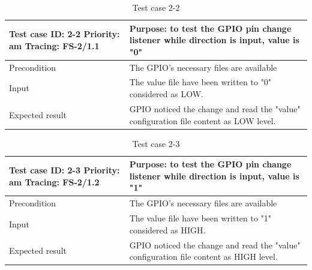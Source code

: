 \begin{table}[H]
	\caption{Test case 2-2}
	\label{table:TCase-FS2-2}
	\begin{center}
		\renewcommand{\arraystretch}{1.8}
		\begin{tabu} 
			to 0.9 \textwidth
			{  X[0.4, c] X[c] }
			\toprule
			Test case ID: 2-2 \newline Priority: am \newline Tracing: FS-2/1.1 & Purpose: to test the GPIO pin change listener while direction is input, value is "0"  \\ \midrule
			Precondition                                                       & The GPIO's necessary files are available                                              \\
			Input                                                              & The value file have been written to "0" considered as LOW.                            \\
			Expected result                                                    & GPIO noticed the change and read the "value" configuration file content as LOW level. \\ \bottomrule
		\end{tabu}
	\end{center}
\end{table} 

\begin{table}[H]
	\caption{Test case 2-3}
	\label{table:TCase-FS2-3}
	\begin{center}
		\renewcommand{\arraystretch}{1.8}
		\begin{tabu} 
			to 0.9 \textwidth
			{  X[0.4, c] X[c] }
			\toprule
			Test case ID: 2-3 \newline Priority: am \newline Tracing: FS-2/1.2 & Purpose: to test the GPIO pin change listener while direction is input, value is "1"   \\ \midrule
			Precondition                                                       & The GPIO's necessary files are available                                               \\
			Input                                                              & The value file have been written to "1" considered as HIGH.                            \\
			Expected result                                                    & GPIO noticed the change and read the "value" configuration file content as HIGH level. \\ \bottomrule
		\end{tabu}
	\end{center}
\end{table} 

